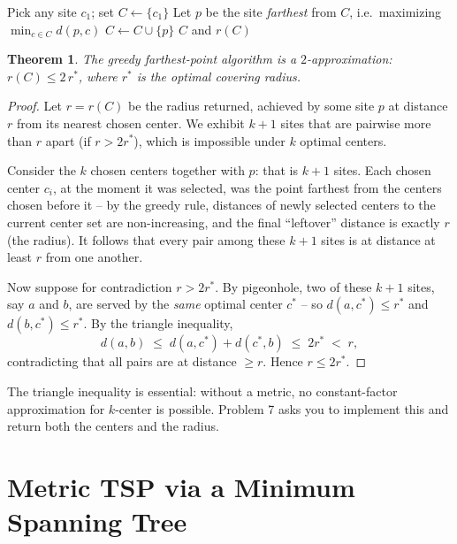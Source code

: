 \documentclass[11pt]{article}
\newtheorem{theorem}{Theorem}[section]
\begin{document}
\begin{algorithm}[h]
\caption{Greedy Farthest-Point $k$-Center (Problem 7)}
\begin{algorithmic}[1]
\State Pick any site $c_1$; set $C \gets \{c_1\}$
    \State Let $p$ be the site \emph{farthest} from $C$, i.e.\ maximizing $\min_{c \in C} d(p, c)$
    \State $C \gets C \cup \{p\}$
\EndFor
\State \Return $C$ and $r(C)$
\end{algorithmic}
\end{algorithm}

\begin{theorem}
\label{thm:kcenter}
The greedy farthest-point algorithm is a $2$-approximation: $r(C) \le 2\, r^\ast$, where
$r^\ast$ is the optimal covering radius.
\end{theorem}

\begin{proof}
Let $r = r(C)$ be the radius returned, achieved by some site $p$ at distance $r$ from its
nearest chosen center. We exhibit $k + 1$ sites that are pairwise more than $r$ apart
(if $r > 2 r^\ast$), which is impossible under $k$ optimal centers.

Consider the $k$ chosen centers together with $p$: that is $k+1$ sites. Each chosen center
$c_i$, at the moment it was selected, was the point farthest from the centers chosen
before it -- by the greedy rule, distances of newly selected centers to the current center
set are non-increasing, and the final ``leftover'' distance is exactly $r$ (the radius). It
follows that every pair among these $k+1$ sites is at distance at least $r$ from one
another.

Now suppose for contradiction $r > 2 r^\ast$. By pigeonhole, two of these $k+1$ sites,
say $a$ and $b$, are served by the \emph{same} optimal center $c^\ast$ -- so $d(a,
c^\ast) \le r^\ast$ and $d(b, c^\ast) \le r^\ast$. By the triangle inequality,
\[
    d(a, b) \;\le\; d(a, c^\ast) + d(c^\ast, b) \;\le\; 2 r^\ast \;<\; r,
\]
contradicting that all pairs are at distance $\ge r$. Hence $r \le 2 r^\ast$.
\end{proof}

The triangle inequality is essential: without a metric, no constant-factor approximation
for $k$-center is possible. Problem 7 asks you to implement this and return both the
centers and the radius.

\section{Metric TSP via a Minimum Spanning Tree}
\end{document}
